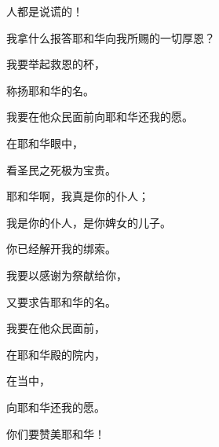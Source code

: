 {\par }{\Q 人都是说谎的！
\par }{\BB \par }{\Q {}我拿什么报答耶和华向我所赐的一切厚恩？
\par }{\Q {}我要举起救恩的杯，
\par }{\Q 称扬耶和华的名。
\par }{\Q {}我要在他众民面前向耶和华还我的愿。
\par }{\BB \par }{\Q {}在耶和华眼中，
\par }{\Q 看圣民之死极为宝贵。
\par }{\Q {}耶和华啊，我真是你的仆人；
\par }{\Q 我是你的仆人，是你婢女的儿子。
\par }{\Q 你已经解开我的绑索。
\par }{\Q {}我要以感谢为祭献给你，
\par }{\Q 又要求告耶和华的名。
\par }{\Q {}我要在他众民面前，
\par }{\Q 在耶和华殿的院内，
\par }{\Q 在{}当中，
\par }{\Q 向耶和华还我的愿。
\par }{\BB \par }{\Q 你们要赞美耶和华！

\par }
